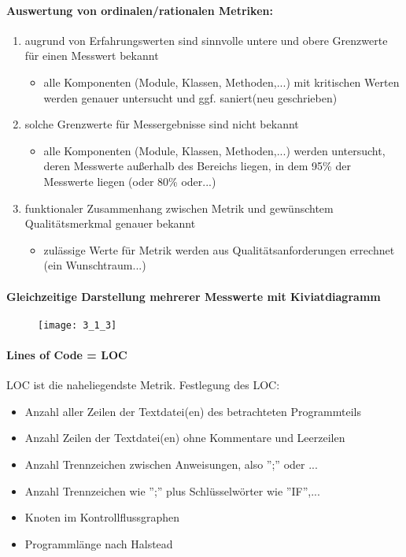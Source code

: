 \paragraph{Auswertung von ordinalen/rationalen Metriken:}
\begin{enumerate}
	\item augrund von Erfahrungswerten sind sinnvolle untere und obere Grenzwerte für einen Messwert bekannt
	\begin{itemize}
		\item alle Komponenten (Module, Klassen, Methoden,...) mit kritischen Werten werden genauer untersucht und ggf. saniert(neu geschrieben)
	\end{itemize}
	\item solche Grenzwerte für Messergebnisse sind nicht bekannt
	\begin{itemize}
		\item alle Komponenten (Module, Klassen, Methoden,...) werden untersucht, deren Messwerte außerhalb des Bereichs liegen, in dem 95\% der Messwerte liegen (oder 80\% oder...)
	\end{itemize}
	\item funktionaler Zusammenhang zwischen Metrik und gewünschtem Qualitätsmerkmal genauer bekannt
	\begin{itemize}
		\item zulässige Werte für Metrik werden aus Qualitätsanforderungen errechnet (ein Wunschtraum...)
	\end{itemize}
	
\end{enumerate}

\paragraph{Gleichzeitige Darstellung mehrerer Messwerte mit Kiviatdiagramm}

\begin{figure}[h]
	\centering
	\texttt{[image: 3\_1\_3]}
\end{figure}

\paragraph{Lines of Code = LOC}

LOC ist die naheliegendste Metrik. Festlegung des LOC:
\begin{itemize}
	\item Anzahl aller Zeilen der Textdatei(en) des betrachteten Programmteils
	\item Anzahl Zeilen der Textdatei(en) ohne Kommentare und Leerzeilen
	\item Anzahl Trennzeichen zwischen Anweisungen, also '';'' oder ...
	\item Anzahl Trennzeichen wie '';'' plus Schlüsselwörter wie ''IF'',...
	\item Knoten im Kontrollflussgraphen
	\item Programmlänge nach Halstead
\end{itemize}

